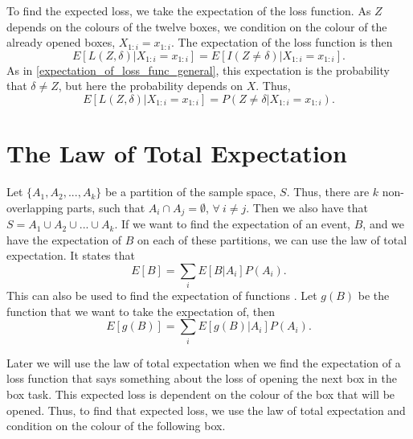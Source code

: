 To find the expected loss, we take the expectation of the loss function. As $Z$ depends on the colours of the twelve boxes, we condition on the colour of the already opened boxes, $ X_{1:i}=x_{1:i}$. The expectation of the loss function is then
\begin{equation*}
    E[L(Z,\delta)|X_{1:i}=x_{1:i}] = E[I(Z\neq \delta)|X_{1:i}=x_{1:i}].
\end{equation*}
As in \eqref{expectation_of_loss_func_general}, this expectation is the probability that $\delta \neq Z$, but here the probability depends on $X$. Thus,
\begin{equation}
\label{exp_loss_theory}
    E[L(Z,\delta)|X_{1:i}=x_{1:i}] = P(Z\neq \delta|X_{1:i}=x_{1:i}).
\end{equation}








\section{The Law of Total Expectation}
Let $\{A_1,A_2,...,A_k\}$ be a partition of the sample space, $S$. Thus, there are $k$ non-overlapping parts, such that $A_i \cap A_j = \emptyset$, $\forall \:
i \neq j$. Then we also have that $S = A_1 \cup A_2 \cup...\cup A_k$. If we want to find the expectation of an event, $B$, and we have the expectation of $B$ on each of these partitions, we can use the law of total expectation. It states that
\begin{equation}
    E[B] = \sum_i E[B|A_i]P(A_i).
\end{equation}
This can also be used to find the expectation of functions \citep{schay2016introduction}. Let $g(B)$ be the function that we want to take the expectation of, then
\begin{equation}
\label{law_tot_exp_func}
    E[g(B)] = \sum_i E[g(B)|A_i]P(A_i).
\end{equation}

Later we will use the law of total expectation when we find the expectation of a loss function that says something about the loss of opening the next box in the box task. This expected loss is dependent on the colour of the box that will be opened. Thus, to find that expected loss, we use the law of total expectation and condition on the colour of the following box. 

